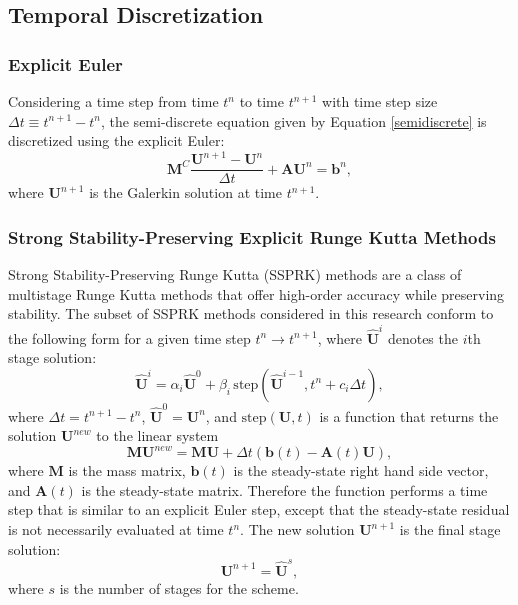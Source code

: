 \subsection{Temporal Discretization}
\subsubsection{Explicit Euler}
Considering a time step from time $t^n$ to time $t^{n+1}$ with time step size
$\Delta t\equiv t^{n+1}-t^n$, the semi-discrete equation given by Equation
\eqref{semidiscrete} is discretized using the explicit Euler:
\begin{equation}\label{exgalerkin}
   \mathbf{M}^C\frac{\mathbf{U}^{n+1}-\mathbf{U}^n}{\Delta t}
     + \mathbf{A}\mathbf{U}^n = \mathbf{b}^n,
\end{equation}
where $\mathbf{U}^{n+1}$ is the Galerkin solution at time $t^{n+1}$.
\subsubsection{Strong Stability-Preserving Explicit Runge Kutta Methods}
\label{ssprk}
Strong Stability-Preserving Runge Kutta (SSPRK) methods are a class of multistage
Runge Kutta methods that offer high-order accuracy while preserving stability.
The subset of SSPRK methods considered in this research conform to the
following form for a given time step $t^n\rightarrow t^{n+1}$,
where $\hat{\mathbf{U}}^i$ denotes the $i$th stage solution:
\begin{equation}
   \hat{\mathbf{U}}^i = \alpha_i\hat{\mathbf{U}}^0
   + \beta_i\,\mbox{step}(\hat{\mathbf{U}}^{i-1},t^n+c_i\Delta t),
\end{equation}
where $\Delta t=t^{n+1}-t^n$, $\hat{\mathbf{U}}^0=\mathbf{U}^n$,
and $\mbox{step}(\mathbf{U},t)$
is a function that returns the solution $\mathbf{U}^{new}$ to the linear system
\begin{equation}
   \mathbf{M}\mathbf{U}^{new} = \mathbf{M}\mathbf{U}
   + \Delta t(\mathbf{b}(t) - \mathbf{A}(t)\mathbf{U}),
\end{equation}
where $\mathbf{M}$ is the mass matrix, $\mathbf{b}(t)$ is the steady-state
right hand side vector, and $\mathbf{A}(t)$ is the steady-state matrix.
Therefore the function performs a time step that is similar to an
explicit Euler step, except that the steady-state residual is not
necessarily evaluated at time $t^n$. The new solution $\mathbf{U}^{n+1}$
is the final stage solution:
\begin{equation}
   \mathbf{U}^{n+1} = \hat{\mathbf{U}}^s,
\end{equation}
where $s$ is the number of stages for the scheme.


